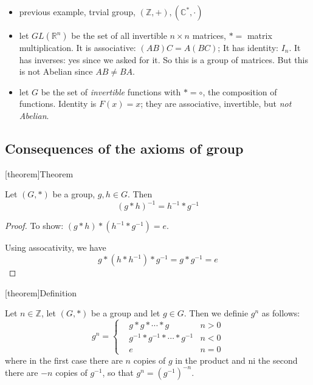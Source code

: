 \documentclass[12pt]{report}
\theoremstyle{definition}
\begin{document}
\begin{ex}
    \;

    \begin{itemize}
            \item previous example, trvial group, $(\mathbb{Z}, +), (\mathbb{C}^{*}, \cdot)$
            \item let $GL(\mathbb{R}^{n})$ be the set of all invertible $n \times n$ matrices, $* = $ matrix multiplication.
                It is associative: $(AB)C = A(BC)$;
                It has identity: $I_n$.
                It has inverses: yes since we asked for it.
                So this is a group of matrices.
                But this is not Abelian since $AB \neq BA$.
            \item let $G$ be the set of \emph{invertible} functions with $* = \circ$, the composition of functions.
                Identity is $F(x) = x$; they are associative, invertible, but \emph{not Abelian}.
    \end{itemize}
    
\end{ex}

\subsection{Consequences of the axioms of group}

[theorem]{Theorem}
\begin{inverse binary opereation}
    Let $(G,*)$ be a group, $g, h \in G$. Then \[
        {(g*h)}^{-1} = h^{-1} * g^{-1}
    \]
\end{inverse binary opereation}
\begin{proof}
    To show: $(g*h) * (h^{-1} * g^{-1}) = e$.

    Using assocativity, we have \[
        g*(h*h^{-1})*g^{-1} = g*g^{-1} = e
    \]
\end{proof}

[theorem]{Definition}
\begin{g to the power of n}
    Let $n \in \mathbb{Z}$, let $(G,*)$ be a group and let $g \in G$. Then we definie $g^{n}$ as follows:\[
        g^{n} = \left\{
            \begin{align*}
                & g * g * \cdots * g & n > 0 \\
                & g^{-1} * g^{-1} * \cdots * g^{-1} & n < 0 \\
                & e & n = 0
            \end{align*}
            \right.
    \]
    where in the first case there are $n$ copies of $g$ in the product and ni the second there are $-n$
    copies of $g^{-1}$, so that $g^{n} = {(g^{-1})}^{-n}$.
\end{g to the power of n}
\end{document}

